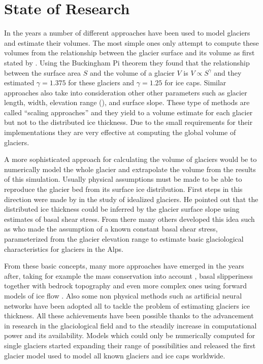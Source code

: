 \section{State of Research}\label{research}
In the years a number of different approaches have been used to model glaciers and estimate their volumes.
The most simple ones only attempt to compute these volumes from the relationship between the glacier surface and its volume as first stated by \citet{bahr1997}. Using the Buckingham Pi
theorem they found that the relationship between the surface area $S$ and the volume of a glacier $V$ is $V \propto S^{\gamma}$ and they estimated $\gamma=1.375$ for these glaciers and $\gamma=1.25$ for ice caps. Similar approaches also take into consideration other other parameters such as glacier length, width, elevation range (\cite{Grinsted2013}), and surface slope. These type of methods are called ``scaling approaches'' and they yield to a volume estimate for each glacier but not to the distributed ice thickness. Due to the small requirements for their implementations they are very effective at computing the global volume of glaciers.

A more sophisticated approach for calculating the volume of glaciers would be to numerically model the whole glacier and extrapolate the volume from the results of this simulation. Usually physical assumptions must be made to be able to reproduce the glacier bed from its surface ice distribution.
First steps in this direction were made by \citet{Nye1965} in the study of  idealized glaciers. He pointed out that the distributed ice thickness could be inferred by the glacier surface slope using estimates of basal shear stress. From there many others developed this idea such as \citet{haeberli1995} who made the assumption of a known constant basal shear stress, parameterized from the glacier elevation range to estimate basic glaciological characteristics for glaciers in the Alps. 

From these basic concepts, many more approaches have emerged in the years after, taking for example the mass conservation into account \cite{rasmussen_1988}, basal slipperiness together with bedrock topography \cite{Gudmundsson2001} and even more complex ones using forward models of ice flow \cite{vanPelt2013}. Also some non physical methods such as artificial neural networks \cite{Clarke2009} have been adopted all to tackle the problem of estimating glaciers ice thickness. All these achievements have been possible thanks to the advancement in research in the glaciological field and to the steadily increase in computational power and its availability. Models which could only be numerically computed for single glaciers started expanding their range of possibilities and \citet{Huss2012} released the first glacier model used to model all known glaciers and ice caps worldwide.

